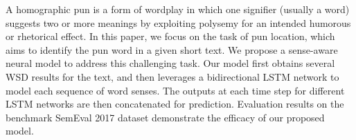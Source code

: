 A homographic pun is a form of wordplay in which one signifier (usually a word) suggests two or more meanings by exploiting polysemy for an intended humorous or rhetorical effect. In this paper, we focus on the task of pun location, which aims to identify the pun word in a given short text. We propose a sense-aware neural model to address this challenging task. Our model first obtains several WSD results for the text, and then leverages a bidirectional LSTM network to model each sequence of word senses. The outputs at each time step for different LSTM networks are then concatenated for prediction. Evaluation results on the benchmark SemEval 2017 dataset demonstrate the efficacy of our proposed model.
